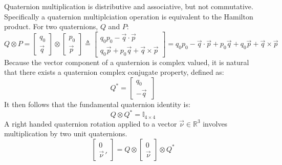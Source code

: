 Quaternion multiplication is distributive and associative, but not commutative. Specifically a quaternion multiplciation operation is equivalent to the Hamilton product. For two quaternions, $Q$ and $P$:
\begin{subequations}
\begin{equation}
Q\otimes P = \begin{bmatrix}
q_0 \\
\vec{q}
\end{bmatrix}
\otimes
\begin{bmatrix}
p_0 \\
\vec{p}
\end{bmatrix}
\end{equation}
\begin{equation}
\triangleq\begin{bmatrix}
q_0p_0-\vec{q}\cdot\vec{p}\\
q_0\vec{p}+p_0\vec{q}+\vec{q}\times\vec{p}
\end{bmatrix}
\end{equation}
\begin{equation}\label{eq:quaternion-product}
=q_0 p_0 - \vec{q}\cdot \vec{p}+p_0 \vec{q} + q_0 \vec{p} + \vec{q}\times\vec{p}
\end{equation}
\end{subequations}
Because the vector component of a quaternion is complex valued, it is natural that there exists a quaternion complex conjugate property, defined as:
\begin{equation}
Q^*=\begin{bmatrix}
q_0 \\
-\vec{q}~
\end{bmatrix}
\end{equation}
It then follows that the fundamental quaternion identity is:
\begin{equation}
Q\otimes Q^* = \mathbb{I}_{4\times 4}
\end{equation}
A right handed quaternion rotation applied to a vector $\vec{\nu} \in\mathbb{R}^3$ involves multiplication by two unit quaternions. 
\begin{equation}
\begin{bmatrix}
0 \\
\vec{\nu}\hspace{2pt}'
\end{bmatrix}
=Q\otimes
\begin{bmatrix}
0 \\
\vec{\nu}
\end{bmatrix}
\otimes Q^*
\end{equation}
